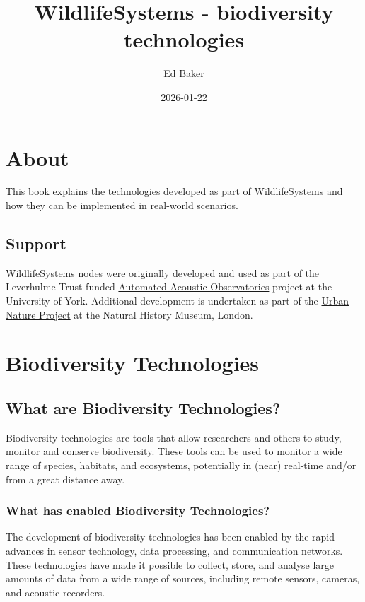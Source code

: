 \documentclass[
]{book}
\title{WildlifeSystems - biodiversity technologies}
\author{\href{https://ebaker.me.uk}{Ed Baker}}
\date{2026-01-22}
\begin{document}
\maketitle

{
\setcounter{tocdepth}{1}
\tableofcontents
}
\chapter*{About}\label{about}

This book explains the technologies developed as part of \href{https://wildlife.systems}{WildlifeSystems} and how they can be implemented in real-world scenarios.

\section*{Support}\label{support}

WildlifeSystems nodes were originally developed and used as part of the Leverhulme Trust funded \href{https://ebaker.me.uk/aao}{Automated Acoustic Observatories} project at the University of York. Additional development is undertaken as part of the \href{https://www.nhm.ac.uk/about-us/urban-nature-project.html}{Urban Nature Project} at the Natural History Museum, London.

\chapter{Biodiversity Technologies}\label{biodiversity-technologies}

\section{What are Biodiversity Technologies?}\label{what-are-biodiversity-technologies}

Biodiversity technologies are tools that allow researchers and others to study, monitor and
conserve biodiversity. These tools can be used to monitor a wide range of species, habitats, and ecosystems, potentially in (near) real-time and/or from a great distance away.

\subsection{What has enabled Biodiversity Technologies?}\label{what-has-enabled-biodiversity-technologies}

The development of biodiversity technologies has been enabled by the rapid advances in sensor technology, data processing, and communication networks. These technologies have made it possible to collect, store, and analyse large amounts of data from a wide range of sources, including remote sensors, cameras, and acoustic recorders.
\end{document}
